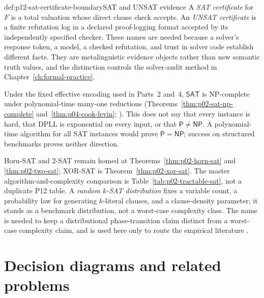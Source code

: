 \begin{hbdefinition}{def:p12-sat-certificate-boundary}{SAT and UNSAT evidence}
A \emph{SAT certificate} for \(F\) is a total valuation whose direct clause
check accepts.  An \emph{UNSAT certificate} is a finite refutation log in a
declared proof-logging format accepted by its independently specified checker.  These
names are needed because a solver's response token, a model, a checked
refutation, and trust in solver code establish different facts.  They are
metalinguistic evidence objects rather than new semantic truth values, and the
distinction controls the solver-audit method in
  Chapter~\ref{ch:formal-practice}.
\end{hbdefinition}

Under the fixed effective encoding used in Parts~2 and~4,
\(\mathsf{SAT}\) is NP-complete under polynomial-time many-one reductions
(Theorems~\ref{thm:p02-sat-np-complete} and~\ref{thm:p04-cook-levin};
\cite{Cook1971}).  This does not say that every instance is hard, that DPLL is
exponential on every input, or that \(\mathsf P\ne\mathsf{NP}\).  A
polynomial-time algorithm for all SAT instances would prove
\(\mathsf P=\mathsf{NP}\); success on structured benchmarks proves neither
direction.

Horn-SAT and 2-SAT remain homed at Theorems~\ref{thm:p02-horn-sat} and
\ref{thm:p02-two-sat}; XOR-SAT is Theorem~\ref{thm:p02-xor-sat}.  The master
algorithm-and-complexity comparison is Table~\ref{tab:p02-tractable-sat}, not
a duplicate P12 table.  A \emph{random \(k\)-SAT
distribution} fixes a variable count, a probability law for generating
\(k\)-literal clauses, and a clause-density parameter; it stands as a benchmark
distribution, not a worst-case complexity class.  The name is needed to keep a
distributional phase-transition claim distinct from a worst-case complexity
claim, and is used here only to route the empirical literature
\cite{MitchellSelmanLevesque1992}.

\section{Decision diagrams and related problems}

